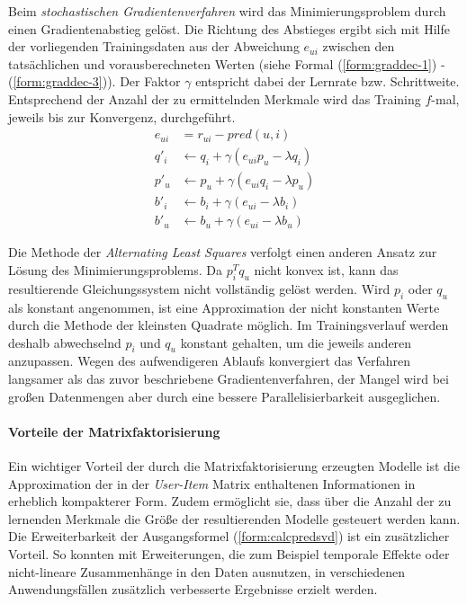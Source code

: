 Beim \textit{stochastischen Gradientenverfahren} \citep{funk2006} wird das Minimierungsproblem durch einen Gradientenabstieg gelöst. Die Richtung des Abstieges  ergibt sich mit Hilfe der vorliegenden Trainingsdaten aus der Abweichung $e_{ui}$ zwischen den tatsächlichen und vorausberechneten Werten (siehe Formal (\ref{form:graddec-1}) - (\ref{form:graddec-3})). Der Faktor $\gamma$ entspricht dabei der Lernrate bzw. Schrittweite. Entsprechend der Anzahl der zu ermittelnden Merkmale wird das Training $f$-mal, jeweils bis zur Konvergenz, durchgeführt. \citep{funk2006,Langford09,hb_05}
\begin{align}
e_{ui} & =  r_{ui} - pred(u,i) \label{form:graddec-1} \\
q'_i & \gets q_i + \gamma (e_{ui} p_u - \lambda q_i ) \label{form:graddec-2} \\
p'_u & \gets p_u + \gamma (e_{ui} q_i - \lambda p_u) \\
b'_i & \gets b_i + \gamma (e_{ui} - \lambda b_i) \\
b'_u & \gets b_u + \gamma (e_{ui} - \lambda b_u) \label{form:graddec-3}
\end{align}

Die Methode der \textit{Alternating Least Squares} \citep{Bell:2007:SCF:1441428.1442050} verfolgt einen anderen Ansatz zur Lösung des Minimierungsproblems. Da $ p_i^T q_u $ nicht konvex ist, kann das resultierende Gleichungssystem nicht vollständig gelöst werden. Wird $p_i$ oder $q_u$ als konstant angenommen, ist eine Approximation der nicht konstanten Werte durch die Methode der kleinsten Quadrate möglich. Im Trainingsverlauf werden deshalb abwechselnd $p_i$ und $q_u$ konstant gehalten, um die jeweils anderen anzupassen. Wegen des aufwendigeren Ablaufs konvergiert das Verfahren langsamer als das zuvor beschriebene Gradientenverfahren, der Mangel wird bei großen Datenmengen aber durch eine bessere Parallelisierbarkeit ausgeglichen. \citep{Bell:2007:SCF:1441428.1442050, hb_05} %

\paragraph{Vorteile der Matrixfaktorisierung} Ein wichtiger Vorteil der durch die Matrixfaktorisierung erzeugten Modelle ist die Approximation der in der \textit{User-Item} Matrix enthaltenen Informationen in erheblich kompakterer Form. Zudem ermöglicht sie, dass über die Anzahl der zu lernenden Merkmale die Größe der resultierenden Modelle gesteuert werden kann. Die Erweiterbarkeit der Ausgangsformel (\ref{form:calcpredsvd}) ist ein zusätzlicher Vorteil. So konnten mit Erweiterungen, die zum Beispiel temporale Effekte oder nicht-lineare Zusammenhänge in den Daten ausnutzen, in verschiedenen Anwendungsfällen zusätzlich verbesserte Ergebnisse erzielt werden. \citep{hb_05,Vozalis:2007:USD:1243505.1243639}


